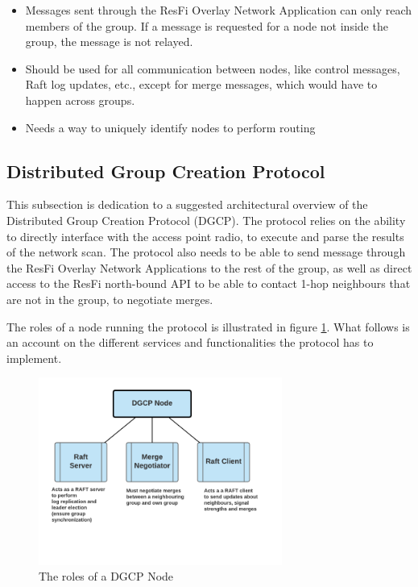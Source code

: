 \begin{itemize}
	\item Messages sent through the ResFi Overlay Network Application can only reach members of the group. If a message is requested for a node not inside the group,
		the message is not relayed.
  \item Should be used for all communication between nodes, like control messages, Raft log updates, etc., except for merge messages, which would have to happen across
		groups. 
	\item Needs a way to uniquely identify nodes to perform routing
\end{itemize}


\subsection{Distributed Group Creation Protocol}
This subsection is dedication to a suggested architectural overview of the Distributed Group Creation Protocol (DGCP). 
The protocol relies on the ability to directly interface with the access point radio, to execute and parse the results of the network scan. The protocol also
needs to be able to send message through the ResFi Overlay Network Applications to the rest of the group, as well as direct access to the ResFi north-bound API to be able to contact 1-hop
neighbours that are not in the group, to negotiate merges. 

The roles of a node running the protocol is illustrated in figure \ref{fig:dgcproles}. What follows is an account on the different services and functionalities the protocol
has to implement.  

\begin{figure}
	\centering
	\includegraphics[width=8cm]{Images/dgcpnode.png}
		\caption{The roles of a DGCP Node }%
		\label{fig:dgcproles}%
\end{figure}

